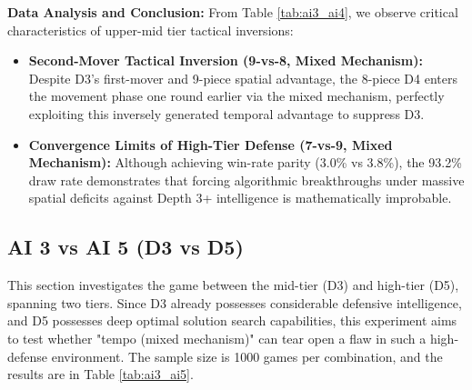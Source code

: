 \textbf{Data Analysis and Conclusion:} 
From Table \ref{tab:ai3_ai4}, we observe critical characteristics of upper-mid tier tactical inversions:
\begin{itemize}
    \item \textbf{Second-Mover Tactical Inversion (9-vs-8, Mixed Mechanism):} Despite D3's first-mover and 9-piece spatial advantage, the 8-piece D4 enters the movement phase one round earlier via the mixed mechanism, perfectly exploiting this inversely generated temporal advantage to suppress D3.
    \item \textbf{Convergence Limits of High-Tier Defense (7-vs-9, Mixed Mechanism):} Although achieving win-rate parity (3.0\% vs 3.8\%), the 93.2\% draw rate demonstrates that forcing algorithmic breakthroughs under massive spatial deficits against Depth 3+ intelligence is mathematically improbable.
\end{itemize}

\subsection{AI 3 vs AI 5 (D3 vs D5)}
\label{subsec:ai3_ai5}

This section investigates the game between the mid-tier (D3) and high-tier (D5), spanning two tiers. Since D3 already possesses considerable defensive intelligence, and D5 possesses deep optimal solution search capabilities, this experiment aims to test whether "tempo (mixed mechanism)" can tear open a flaw in such a high-defense environment. The sample size is 1000 games per combination, and the results are in Table \ref{tab:ai3_ai5}.

\begin{table}[htbp]
    \centering
    \caption{AI 3 vs AI 5 Simulation Data Distribution (Sample Size=1000)}
    \label{tab:ai3_ai5}
\end{table}

